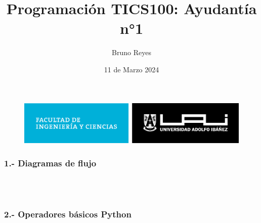 \documentclass{article}
\begin{document}
\begin{figure}
    \centering
    \includegraphics[width=0.7\linewidth]{../img/facultad-de-ingenieria-y-ciencias.png} 
\end{figure}

\title{Programación TICS100: Ayudantía n°1}
\author{Bruno Reyes}
\date{11 de Marzo 2024}


\maketitle


\subsubsection*{1.- Diagramas de flujo}

 \\

 \\

\subsubsection*{2.- Operadores básicos Python}

 \\

 \\

 \\
\end{document}
